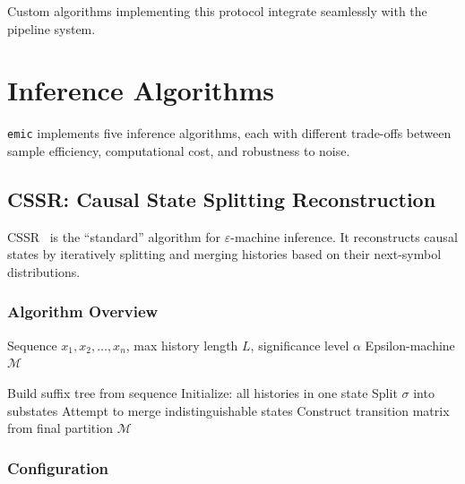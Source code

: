 \documentclass[11pt,a4paper]{report}
\theoremstyle{definition}
\theoremstyle{plain}
\newcommand{\eps}{\varepsilon}
\newcommand{\emic}{\texttt{emic}}
\begin{document}
Custom algorithms implementing this protocol integrate seamlessly with the pipeline system.

\chapter{Inference Algorithms}
\label{ch:algorithms}

\emic{} implements five inference algorithms, each with different trade-offs between sample efficiency, computational cost, and robustness to noise.

\section{CSSR: Causal State Splitting Reconstruction}

CSSR~\cite{shalizi2004algorithm} is the ``standard'' algorithm for $\eps$-machine inference. It reconstructs causal states by iteratively splitting and merging histories based on their next-symbol distributions.

\subsection{Algorithm Overview}

\begin{algorithm}
\caption{CSSR Algorithm}
\begin{algorithmic}[1]
\Require Sequence $x_1, x_2, \ldots, x_n$, max history length $L$, significance level $\alpha$
\Ensure Epsilon-machine $\mathcal{M}$

\State Build suffix tree from sequence
\State Initialize: all histories in one state
                \State Split $\sigma$ into substates
            \EndIf
        \EndFor
    \EndFor
    \State Attempt to merge indistinguishable states
\EndFor
\State Construct transition matrix from final partition
\State \Return $\mathcal{M}$
\end{algorithmic}
\end{algorithm}

\subsection{Configuration}
\end{document}
